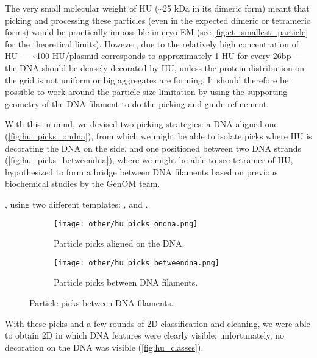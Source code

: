 The very small molecular weight of HU (\sim25 kDa in its dimeric form) meant that picking and processing these particles (even in the expected dimeric or tetrameric forms) would be practically impossible in cryo-EM (see \autoref{fig:et_smallest_particle} for the theoretical limits).
However, due to the relatively high concentration of HU --- \sim100 HU/plasmid corresponds to approximately 1 HU for every 26bp --- the DNA should be densely decorated by HU, unless the protein distribution on the grid is not uniform or big aggregates are forming.
It should therefore be possible to work around the particle size limitation by using the supporting geometry of the DNA filament to do the picking and guide refinement.

With this in mind, we devised two picking strategies: a DNA-aligned one (\autoref{fig:hu_picks_ondna}), from which we might be able to isolate picks where HU is decorating the DNA on the side, and one positioned between two DNA strands (\autoref{fig:hu_picks_betweendna}), where we might be able to see tetramer of HU, hypothesized to form a bridge between DNA filaments based on previous biochemical studies by the GenOM team.

, using two different templates: , and .

\begin{figure}[ht]
    \centering
    \begin{subfigure}[B]{.49\textwidth}
        \centering
        \texttt{[image: other/hu\_picks\_ondna.png]}
        \caption{Particle picks aligned on the DNA.}
        \label{fig:hu_picks_ondna}
    \end{subfigure}%
    \hfill
    \begin{subfigure}[B]{.49\textwidth}
        \centering
        \texttt{[image: other/hu\_picks\_betweendna.png]}
        \caption{Particle picks between DNA filaments.}
        \label{fig:hu_picks_betweendna}
    \end{subfigure}%
    \label{gih:hu_picks}
\end{figure}

With these picks and a few rounds of 2D classification and cleaning, we were able to obtain 2D in which DNA features were clearly visible; unfortunately, no decoration on the DNA was visible (\autoref{fig:hu_classes}).

